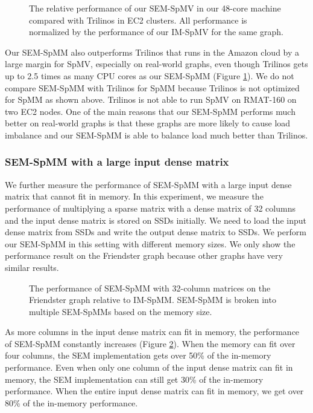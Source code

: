 
\begin{figure}
	\begin{center}
		\footnotesize
		
		\caption{The relative performance of our SEM-SpMV in our 48-core
			machine compared with Trilinos in EC2 clusters. All performance
			is normalized by the performance of our IM-SpMV for the same
			graph.}
		\label{perf:ec2}
	\end{center}
\end{figure}

Our SEM-SpMM also outperforms Trilinos that runs in the Amazon cloud by a large
margin for SpMV, especially on real-world graphs, even though Trilinos gets up
to 2.5 times as many CPU cores as our SEM-SpMM (Figure \ref{perf:ec2}).
We do not compare SEM-SpMM with Trilinos
for SpMM because Trilinos is not optimized for SpMM as shown above. Trilinos
is not able to run SpMV on RMAT-160 on two EC2 nodes.
One of the main reasons that our SEM-SpMM performs much
better on real-world graphs is that these graphs are more likely to cause
load imbalance and our SEM-SpMM is able to balance load much better than
Trilinos.

\subsubsection{SEM-SpMM with a large input dense matrix}

We further measure the performance of SEM-SpMM with a large input dense matrix
that cannot fit in memory. In this experiment, we
measure the performance of multiplying a sparse matrix with a dense matrix
of 32 columns and the input dense matrix is stored on SSDs initially.
We need to load the input dense matrix from SSDs and write the output dense
matrix to SSDs. We perform our SEM-SpMM in this setting with different memory
sizes. We only show the performance result on the Friendster graph because
other graphs have very similar results.

\begin{figure}
	\begin{center}
		\footnotesize
		
		\caption{The performance of SEM-SpMM with 32-column matrices on
			the Friendster graph relative to IM-SpMM. SEM-SpMM is broken into
			multiple SEM-SpMMs based on the memory size.}
		\label{perf:spmm32}
	\end{center}
\end{figure}

As more columns in the input dense matrix can fit in memory, the performance
of SEM-SpMM constantly increases (Figure \ref{perf:spmm32}). When the memory
can fit over four columns, the SEM implementation gets over 50\% of
the in-memory performance. Even when only one column of the input dense matrix
can fit in memory, the SEM implementation can still get 30\% of the in-memory
performance. When the entire input dense matrix can fit in memory, we get over
80\% of the in-memory performance.

